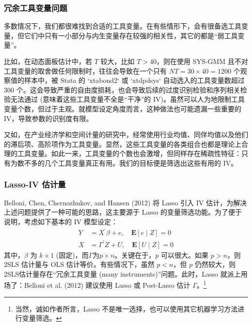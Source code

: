 {%
\subsubsection{冗余工具变量问题}
多数情况下，我们都很难找到合适的工具变量。在有些情形下，会有很备选工具变量，但它们中只有一小部分与内生变量存在较强的相关性，其它的都是“弱工具变量”。

比如，在动态面板估计中，若 $T$ 较大，比如 $T>40$，则在使用 SYS-GMM 且不对工具变量的取舍做任何限制时，往往会导致在一个只有 $NT=30 \times 40 = 1200$ 个观察值的样本中，被 Stata 的 `xtabond2` 或 `xtdpdsys` 自动选入的工具变量数超过 300 个。这会导致严重的自由度损耗，也会导致后续的过度识别检验和序列相关检验无法通过 (意味着这些工具变量不全是“干净”的 IV)。虽然可以人为地限制工具变量个数，但过于主观。就模型设定角度而言，这种做法也可能遗漏一些重要的 IV，导致参数的识别度有限。

又如，在产业经济学和空间计量的研究中，经常使用行业均值、同伴均值以及他们的滞后项、高阶项作为工具变量。显然，这些工具变量的各类组合也都是理论上合理的工具变量。如此一来，工具变量的个数也会激增，但同样存在稀疏性特征：只有为数不多的几个工具变量真正有用。我们的目标便是筛选出这些有用的 IV。

\subsubsection{Lasso-IV 估计量}
Belloni, Chen, Chernozhukov, and Hansen (2012) 将 Lasso 引入 IV 估计，为解决上述问题提供了一种可能的思路，这主要源于 Lasso 的变量筛选功能。为了便于说明，考虑如下基本的 IV 模型设定：
\begin{equation}\label{eq:lasso-iv-01}
	\begin{aligned}
	Y &=X^{\prime} \beta+e,  \quad \mathbf{E}[e \mid Z] =0 \\
	X &=\Gamma^{\prime} Z+U, \quad \mathbf{E}[U \mid Z] =0
	\end{aligned}
\end{equation}
其中，$\beta$ 为 $k\times 1$ (固定)，而$\Gamma$为$p\times n$。关键在于，$p$ 可以很大。如果 $p>n$，则 2SLS 估计量与 OLS 估计等价。有些情况下，虽然 $p<n$，但 $p$ 仍然较大，则2SLS估计量存在“冗余工具变量 (many instruments)”问题。此时，Lasso 就派上用场了：Belloni et al. (2012) 建议使用 Lasso 或 Post-Lasso 估计 $\Gamma$。\footnote{%
   当然，诚如作者所言，Lasso 不是唯一选择，也可以使用其它机器学习方法进行变量筛选。}

}
